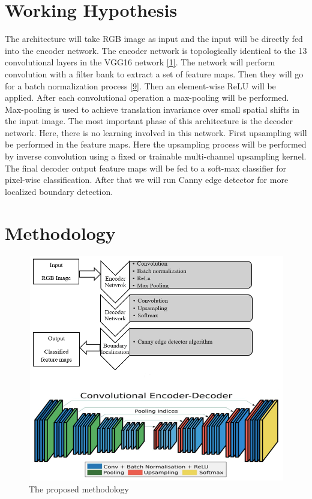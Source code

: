 \documentclass[a4paper,12pt]{article}
\begin{document}
\section{Working Hypothesis}
The architecture will take RGB image as input and the input will be directly fed into the encoder network. The encoder network is topologically identical to the 13 convolutional layers in the VGG16 network  \hyperlink{1}{[1]}. The network will perform convolution with a filter bank to extract a set of feature maps. Then they will go for a batch normalization process  \hyperlink{9}{[9]}. Then an element-wise ReLU will be applied. After each convolutional operation a max-pooling will be performed. Max-pooling is used to achieve translation invariance over small spatial shifts in the input image.
The most important phase of this architecture is the decoder network. Here, there is no learning involved in this network. First upsampling will be performed in the feature maps. Here the upsampling process will be performed by inverse convolution using a fixed or trainable multi-channel upsampling kernel. The final decoder output feature maps will be fed to a soft-max classifier for pixel-wise classification. After that we will run Canny edge detector for more localized boundary detection.

\clearpage

\section{Methodology}

\begin{figure}[h!]
\centering
\includegraphics[width=1.2\textwidth]{fig_1.png}
\caption{The proposed methodology}
\end{figure}
\newpage
\end{document}
